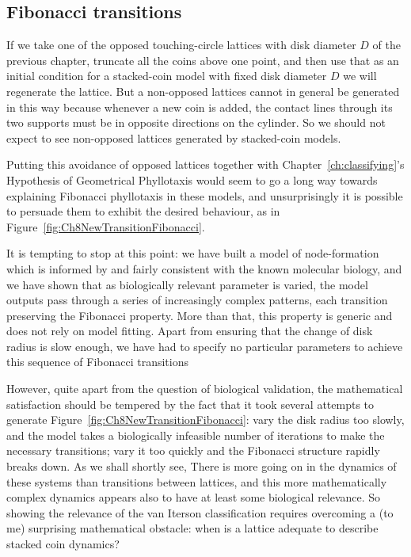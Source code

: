 %

\subsection{Fibonacci transitions}

If we take one of the opposed touching-circle lattices with disk diameter $D$ of the previous chapter, truncate all the coins above one  point, and then use that as an initial condition for a stacked-coin model with fixed disk diameter $D$ we will regenerate the lattice. But a non-opposed lattices cannot in general be generated in this way because 
 whenever a new coin is added, the contact lines through its two supports must be in opposite directions on the cylinder. So we should not expect to see non-opposed lattices generated by stacked-coin models.
 
Putting this avoidance of opposed lattices together with Chapter~\ref{ch:classifying}'s Hypothesis of Geometrical Phyllotaxis would seem to go a long way towards explaining Fibonacci phyllotaxis in these models, and unsurprisingly it is possible to persuade them to exhibit the desired behaviour, as in Figure~\ref{fig:Ch8NewTransitionFibonacci}.
% 
%


It is tempting to stop at this point: we have built a model of node-formation which is informed by and fairly consistent with the known molecular biology, and we have shown that as biologically relevant parameter is varied, the model outputs pass through a series of increasingly complex patterns, each transition preserving the Fibonacci property. More than that, this property is generic and does not rely on model fitting. Apart from ensuring that the change of disk radius is slow enough, we have had to specify no particular parameters to achieve this sequence of Fibonacci transitions

However, quite apart from the question of biological validation, the mathematical satisfaction should be tempered by the fact that it took several attempts to generate Figure~\ref{fig:Ch8NewTransitionFibonacci}: vary the disk radius too slowly, and the model takes a biologically infeasible number of iterations to make the necessary transitions; vary it too quickly and the Fibonacci structure rapidly breaks down. As we shall shortly see, There is more going on in the dynamics of these systems than transitions between lattices, and this more mathematically complex dynamics appears also to have at least some biological relevance.  So showing the   relevance of the van Iterson classification requires overcoming  a (to me) surprising mathematical obstacle: when is a lattice  adequate to describe stacked coin dynamics?

